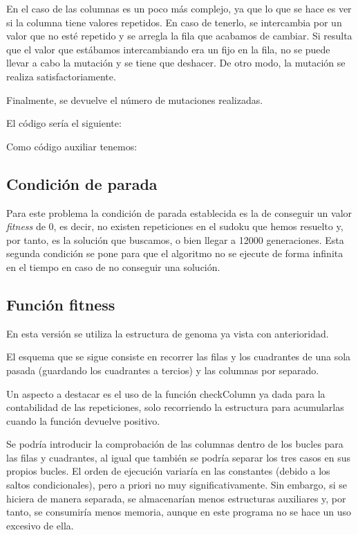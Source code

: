 \documentclass[a4,11pt]{article}
\begin{document}
	En el caso de las columnas es un poco más complejo, ya que lo que se hace es ver si la columna tiene valores repetidos. En caso de tenerlo, se intercambia por un valor que no esté repetido y se arregla la fila que acabamos de cambiar. Si resulta que el valor que estábamos intercambiando era un fijo en la fila, no se puede llevar a cabo la mutación y se tiene que deshacer. De otro modo, la mutación se realiza satisfactoriamente.

	Finalmente, se devuelve el número de mutaciones realizadas.

	El código sería el siguiente:


\label{img:mut1}

\label{img:mut2}



	Como código auxiliar tenemos:

	\label{img:check}

\subsection{Condición de parada}\label{des:parada}

Para este problema la condición de parada establecida es la de conseguir un valor \emph{fitness} de 0, es decir, no existen repeticiones en el sudoku que hemos resuelto y, por tanto, es la solución que buscamos, o bien llegar a 12000 generaciones. Esta segunda condición se pone para que el algoritmo no se ejecute de forma infinita en el tiempo en caso de no conseguir una solución.

\subsection{Función fitness}\label{des:fitness}

	En esta versión se utiliza la estructura de genoma ya vista con anterioridad.

	El esquema que se sigue consiste en recorrer las filas y los cuadrantes de una sola pasada (guardando los cuadrantes a tercios) y las columnas por separado.

	Un aspecto a destacar es el uso de la función checkColumn ya dada para la contabilidad de las repeticiones, solo recorriendo la estructura para acumularlas cuando la función devuelve positivo.

	Se podría introducir la comprobación de las columnas dentro de los bucles para las filas y cuadrantes, al igual que también se podría separar los tres casos en sus propios bucles. El orden de ejecución variaría en las constantes (debido a los saltos condicionales), pero a priori no muy significativamente. Sin embargo, si se hiciera de manera separada, se  almacenarían menos estructuras auxiliares y, por tanto, se consumiría menos memoria, aunque en este programa no se hace un uso excesivo de ella.
\end{document}

